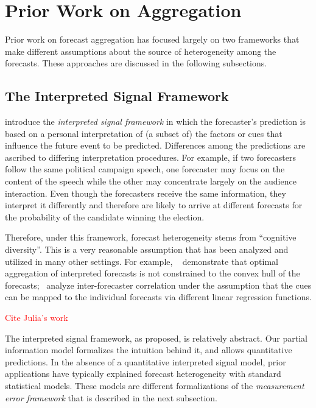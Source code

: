 \documentclass[11pt]{article}
\theoremstyle{definition}
\theoremstyle{definition}
\begin{document}
\section{Prior Work on Aggregation}
\label{sec:prior}
Prior work on forecast aggregation has focused largely on two frameworks that make different assumptions about the source of heterogeneity among the forecasts.  These approaches are discussed in the following
subsections.

\subsection{The Interpreted Signal Framework}
\label{ss:inerpreted}

\citet{hong2009interpreted} introduce the {\em interpreted signal
framework} in which the forecaster's prediction is based on a personal
interpretation of (a subset of) the factors or cues that influence the
future event to be predicted.  Differences among the 
predictions are ascribed to differing interpretation procedures.  For
example, if two forecasters follow the same political campaign speech,
one forecaster may focus on the content of the speech while the other may
concentrate largely on the audience interaction.  Even though the
forecasters receive the same information, they interpret it
differently and therefore are likely to arrive at different forecasts for the probability of the candidate winning the election.

Therefore, under this framework, forecast heterogeneity stems from ``cognitive
diversity''.  This is a very reasonable assumption that has been analyzed and
utilized in many other settings.  For example,
~\citet{parunak2013characterizing} demonstrate that optimal
aggregation of interpreted forecasts is not constrained to the
convex hull of the forecasts;~\citet{broomell2009experts} analyze
inter-forecaster correlation under the assumption that the cues can be
mapped to the individual forecasts via different linear regression
functions.

\textcolor{red}{Cite Julia's work}


The interpreted signal framework, as proposed, is relatively abstract. 
Our partial information model formalizes the intuition behind it, and
allows quantitative predictions. In the absence of a quantitative
interpreted signal model, prior applications have typically explained forecast heterogeneity  with standard statistical models. These models are different formalizations of  the
\textit{measurement error framework} that is described in the next
subsection.
\end{document}
